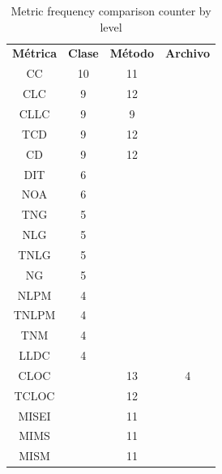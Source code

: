 \begin{table}[H]
\caption{\label{table:metricsCompCountPerLevel} Metric frequency comparison counter by level}
\begin{center}
\begin{tabular}{cccc}
\textbf{Métrica} & \textbf{Clase}       & \textbf{Método} & \textbf{Archivo} \\
CC              & 10                   & 11              &               \\
CLC             & 9                    & 12              &               \\
CLLC            & 9                    & 9               &               \\
TCD             & 9                    & 12              &               \\
CD              & 9                    & 12              &               \\
DIT             & 6                    &                 &               \\
NOA             & 6                    &                 &               \\
TNG             & 5                    &                 &               \\
NLG             & 5                    &                 &               \\
TNLG            & 5                    &                 &               \\
NG              & 5                    &                 &               \\
NLPM            & 4                    &                 &               \\
TNLPM           & 4                    &                 &               \\
TNM             & 4                    &                 &               \\
LLDC            & 4                    &                 &               \\
CLOC            &                      & 13              & 4             \\
TCLOC           &                      & 12              &               \\
MISEI           &                      & 11              &               \\
MIMS            &                      & 11              &               \\
MISM            &                      & 11              &               \\

\end{tabular}
\end{center}
\end{table}
